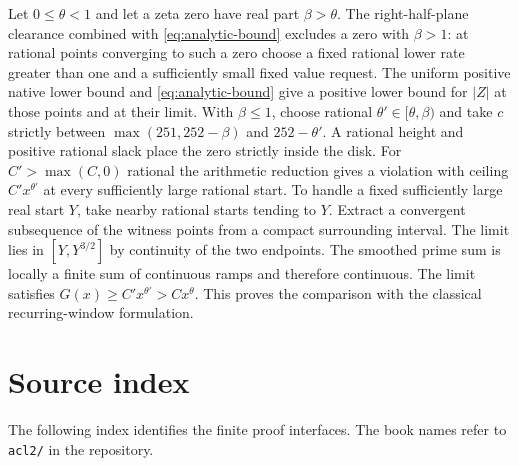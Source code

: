 \documentclass[11pt]{amsart}
\theoremstyle{definition}
\theoremstyle{remark}
\numberwithin{equation}{section}
\newcommand{\code}[1]{\nolinkurl{#1}}
\begin{document}
Let $0\le\theta<1$ and let a zeta zero have real part $\beta>\theta$.
The right-half-plane clearance combined with \eqref{eq:analytic-bound}
excludes a zero with $\beta>1$:
at rational points converging to such a zero choose a fixed rational
lower rate greater than one and a sufficiently small fixed value
request. The uniform positive native lower bound and
\eqref{eq:analytic-bound} give a positive lower bound for $|Z|$
at those points and at their limit. With $\beta\le1$, choose rational
$\theta'\in[\theta,\beta)$ and take $c$ strictly between
$\max(251,252-\beta)$ and $252-\theta'$. A rational height
and positive rational slack place the zero strictly inside the
disk. For $C'>\max(C,0)$ rational the arithmetic reduction gives
a violation with ceiling $C'x^{\theta'}$ at every sufficiently
large rational start. To handle a fixed sufficiently large real
start $Y$, take nearby rational starts tending to $Y$. Extract a
convergent subsequence of the witness points from a compact
surrounding interval. The limit lies in $[Y,Y^{3/2}]$ by continuity
of the two endpoints. The smoothed prime sum is locally a
finite sum of continuous ramps and therefore continuous.
The limit satisfies $G(x)\ge C'x^{\theta'}>Cx^\theta$.
This proves the comparison with the classical recurring-window
formulation.

\appendix
\section{Source index}

The following index identifies the finite proof interfaces.
The book names refer to \code{acl2/} in the repository.
\end{document}
